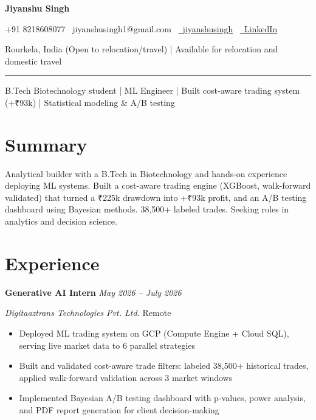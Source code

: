 \documentclass[11pt,a4paper]{article}
\begin{document}
\begin{center}
    {\LARGE \bfseries Jiyanshu Singh}
    
    \vspace{4pt}
    {\small +91 8218608077 \textbullet\ jiyanshusingh1@gmail.com \textbullet\ \href{https://github.com/jiyanshusingh}{\faGithub\ jiyanshusingh} \textbullet\ \href{https://linkedin.com/in/jiyanshusingh}{\faLinkedin\ LinkedIn}}
    
    \vspace{2pt}
    {\footnotesize Rourkela, India (Open to relocation/travel) | Available for relocation and domestic travel}
    
    \rule{\textwidth}{0.4pt}
\end{center}

\begin{center}
    {\large \color{midblue} B.Tech Biotechnology student | ML Engineer | Built cost-aware trading system (+₹93k) | Statistical modeling \& A/B testing}
\end{center}

\vspace{6pt}
\section*{Summary}
Analytical builder with a B.Tech in Biotechnology and hands-on experience deploying ML systems. Built a cost-aware trading engine (XGBoost, walk-forward validated) that turned a ₹225k drawdown into +₹93k profit, and an A/B testing dashboard using Bayesian methods. 38,500+ labeled trades. Seeking roles in analytics and decision science.

\section*{Experience}
\noindent\textbf{Generative AI Intern} \hfill \textit{May 2026 – July 2026}

\noindent\textit{Digitaaztrans Technologies Pvt. Ltd.} \hfill Remote
\begin{itemize}
    \item Deployed ML trading system on GCP (Compute Engine + Cloud SQL), serving live market data to 6 parallel strategies
    \item Built and validated cost-aware trade filters: labeled 38,500+ historical trades, applied walk-forward validation across 3 market windows
    \item Implemented Bayesian A/B testing dashboard with p-values, power analysis, and PDF report generation for client decision-making
\end{itemize}
\end{document}
